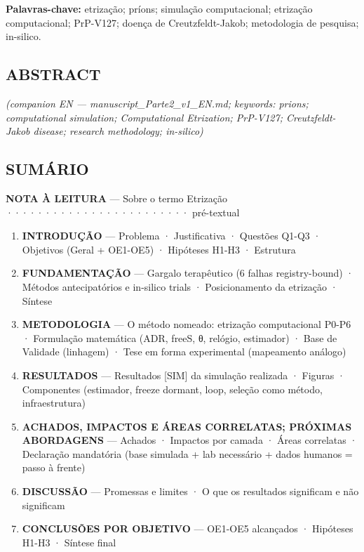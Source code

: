 \documentclass[
  10pt,
]{article}
\providecommand{\tightlist}{%
  \setlength{\itemsep}{0pt}\setlength{\parskip}{0pt}}
\begin{document}
\textbf{Palavras-chave:} etrização; príons; simulação computacional;
etrização computacional; PrP-V127; doença de Creutzfeldt-Jakob;
metodologia de pesquisa; in-silico.

\hypertarget{abstract}{%
\subsection{ABSTRACT}\label{abstract}}

\emph{(companion EN --- manuscript\_Parte2\_v1\_EN.md; keywords: prions;
computational simulation; Computational Etrization; PrP-V127;
Creutzfeldt-Jakob disease; research methodology; in-silico)}

\hypertarget{sumuxe1rio}{%
\subsection{SUMÁRIO}\label{sumuxe1rio}}

\textbf{NOTA À LEITURA} --- Sobre o termo Etrização
························ pré-textual

\begin{enumerate}
\def\labelenumi{\arabic{enumi}.}
\tightlist
\item
  \textbf{INTRODUÇÃO} --- Problema · Justificativa · Questões Q1-Q3 ·
  Objetivos (Geral + OE1-OE5) · Hipóteses H1-H3 · Estrutura
\item
  \textbf{FUNDAMENTAÇÃO} --- Gargalo terapêutico (6 falhas
  registry-bound) · Métodos antecipatórios e in-silico trials ·
  Posicionamento da etrização · Síntese
\item
  \textbf{METODOLOGIA} --- O método nomeado: etrização computacional
  P0-P6 · Formulação matemática (ADR, freeS, θ, relógio, estimador) ·
  Base de Validade (linhagem) · Tese em forma experimental (mapeamento
  análogo)
\item
  \textbf{RESULTADOS} --- Resultados {[}SIM{]} da simulação realizada ·
  Figuras · Componentes (estimador, freeze dormant, loop, seleção como
  método, infraestrutura)
\item
  \textbf{ACHADOS, IMPACTOS E ÁREAS CORRELATAS; PRÓXIMAS ABORDAGENS} ---
  Achados · Impactos por camada · Áreas correlatas · Declaração
  mandatória (base simulada + lab necessário + dados humanos = passo à
  frente)
\item
  \textbf{DISCUSSÃO} --- Promessas e limites · O que os resultados
  significam e não significam
\item
  \textbf{CONCLUSÕES POR OBJETIVO} --- OE1-OE5 alcançados · Hipóteses
  H1-H3 · Síntese final
\end{enumerate}
\end{document}
